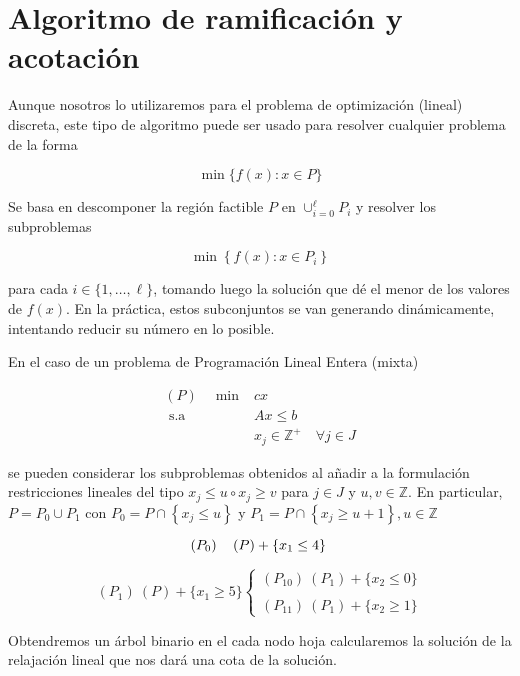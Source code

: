 \documentclass[openany]{book}
\begin{document}
\section{Algoritmo de ramificación y acotación}

Aunque nosotros lo utilizaremos para el problema de optimización (lineal) discreta, este tipo de algoritmo puede ser usado para resolver cualquier problema de la forma

$$
\min \{f(x): x \in P\}
$$

Se basa en descomponer la región factible $P$ en $\cup_{i=0}^{\ell} P_{i}$ y resolver los subproblemas

$$
\min \left\{f(x): x \in P_{i}\right\}
$$

para cada $i \in\{1, \ldots, \ell\}$, tomando luego la solución que dé el menor de los valores de $f(x)$. En la práctica, estos subconjuntos se van generando dinámicamente, intentando reducir su número en lo posible.

En el caso de un problema de Programación Lineal Entera (mixta)

$$
\begin{aligned}
(P) \quad \min & c x \\
\text { s.a } & A x \leq b \\
& x_{j} \in \mathbb{Z}^{+} \quad \forall j \in J
\end{aligned}
$$

se pueden considerar los subproblemas obtenidos al añadir a la formulación restricciones lineales del tipo $x_{j} \leq u \circ x_{j} \geq v$ para $j \in J$ y $u, v \in \mathbb{Z} .$ En particular, $P=P_{0} \cup P_{1}$ con $P_{0}=P \cap\left\{x_{j} \leq u\right\}$ y $P_{1}=P \cap\left\{x_{j} \geq u+1\right\}, u \in \mathbb{Z}$

\begin{example}

  $$
\left(P_{0}\right) \quad(P)+\left\{x_{1} \leq 4\right\} \\
$$

$$
(P_1)\ (P) + \{x_1 \geq 5\} \left\{ \begin{array}{l}
  (P_{10})\ (P_1)+\{x_2 \leq 0\}\\
  \\
  (P_{11})\ (P_1) + \{x_2 \geq 1\}
\end{array} \right.
$$

Obtendremos un árbol binario en el cada nodo hoja calcularemos la solución de la relajación lineal que nos dará una cota de la solución.
\end{example}
\end{document}
